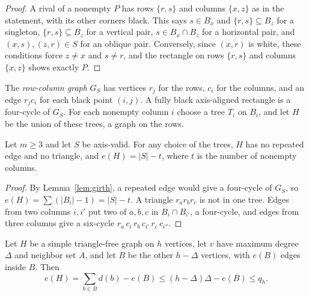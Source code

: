 \begin{proof}
A rival of a nonempty $P$ has rows $\{r,s\}$ and columns $\{x,z\}$ as in the
statement, with its other corners black. This says $s\in B_x$ and $\{r,s\}\subseteq B_z$
for a singleton, $\{r,s\}\subseteq B_z$ for a vertical pair, $s\in B_x\cap B_z$ for a
horizontal pair, and $(x,s),(z,r)\in S$ for an oblique pair. Conversely, since $(x,r)$ is
white, these conditions force $z\ne x$ and $s\ne r$, and the rectangle on rows $\{r,s\}$ and columns
$\{x,z\}$ shows exactly $P$.
\end{proof}

The \emph{row-column graph} $G_S$ has vertices $r_j$ for the rows, $c_i$ for the columns, and an edge $r_jc_i$ for each black point $(i,j)$. A fully black axis-aligned rectangle is a four-cycle of $G_S$.
For each nonempty column $i$ choose a tree $T_i$ on $B_i$, and let $H$ be the union of these trees, a graph on the rows.
\begin{lemma}\label{lem:H}
Let $m\ge3$ and let $S$ be axis-valid. For any choice of the trees, $H$ has no repeated edge and no triangle, and $e(H)=|S|-t$, where $t$ is the number of nonempty columns.
\end{lemma}

\begin{proof}
By Lemma~\ref{lem:girth}, a repeated edge would give a four-cycle of $G_S$, so $e(H)=\sum(|B_i|-1)=|S|-t$. A triangle $r_ar_br_c$ is not in one tree. Edges from two columns $i,i'$ put two of $a,b,c$ in $B_i\cap B_{i'}$, a four-cycle, and edges from three columns give a six-cycle $r_a\,c_i\,r_b\,c_{i'}\,r_c\,c_{i''}$.
\end{proof}

\begin{lemma}\label{lem:mantel}
Let $H$ be a simple triangle-free graph on $h$ vertices, let $v$ have maximum degree $\Delta$ and neighbor set $A$, and let $B$ be the other $h-\Delta$ vertices, with $e(B)$ edges inside $B$. Then
\[
e(H)=\sum_{b\in B}d(b)-e(B)\le(h-\Delta)\Delta-e(B)\le q_h.
\]
\end{lemma}

